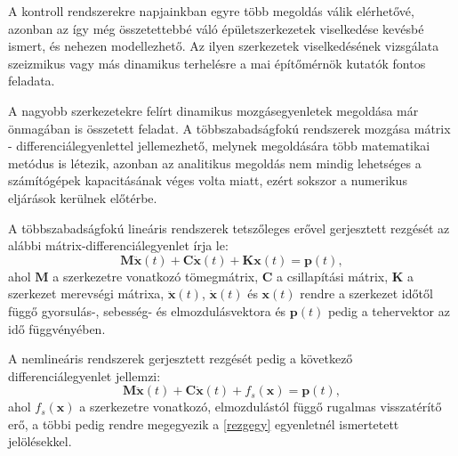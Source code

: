 A kontroll rendszerekre napjainkban egyre több megoldás válik elérhetővé, azonban az így még összetettebbé váló épületszerkezetek viselkedése kevésbé ismert, és nehezen modellezhető. Az ilyen szerkezetek viselkedésének vizsgálata szeizmikus vagy más dinamikus terhelésre  a mai építőmérnök kutatók fontos feladata.%

A nagyobb szerkezetekre felírt dinamikus mozgásegyenletek megoldása már önmagában is összetett feladat. A többszabadságfokú rendszerek mozgása mátrix - differenciálegyenlettel jellemezhető, melynek megoldására több matematikai metódus is létezik, azonban az analitikus megoldás nem mindig lehetséges a számítógépek kapacitásának véges volta miatt, ezért sokszor a numerikus eljárások kerülnek előtérbe. 

A többszabadságfokú lineáris rendszerek tetszőleges erővel gerjesztett rezgését az alábbi mátrix-differenciálegyenlet írja le:
%
\begin{equation}
\label{rezgegy}
\mathbf{M}\mathbf{\ddot{x}}(t)+\mathbf{C}\mathbf{\dot{x}}(t)+\mathbf{K}\mathbf{x}(t) = \mathbf{p}(t),
\end{equation}
%
ahol $\mathbf{M}$ a  szerkezetre vonatkozó tömegmátrix, $\mathbf{C}$ a csillapítási mátrix, $\mathbf{K}$ a szerkezet merevségi mátrixa, $\mathbf{\ddot{x}}(t)$, $\mathbf{\dot{x}}(t)$ és $\mathbf{x}(t)$ rendre a szerkezet időtől függő gyorsulás-, sebesség- és elmozdulásvektora és $\mathbf{p}(t)$ pedig a tehervektor az idő függvényében.

A nemlineáris rendszerek gerjesztett rezgését pedig a következő differenciálegyenlet jellemzi:
\begin{equation}
\label{rezgegy_nemlin}
\mathbf{M}\mathbf{\ddot{x}}(t)+\mathbf{C}\mathbf{\dot{x}}(t)+f_s(\mathbf{x}) = \mathbf{p}(t),
\end{equation}
%
ahol $f_s(\mathbf{x})$ a szerkezetre vonatkozó, elmozdulástól függő rugalmas visszatérítő erő, a többi pedig rendre megegyezik a \eqref{rezgegy} egyenletnél ismertetett jelölésekkel.

